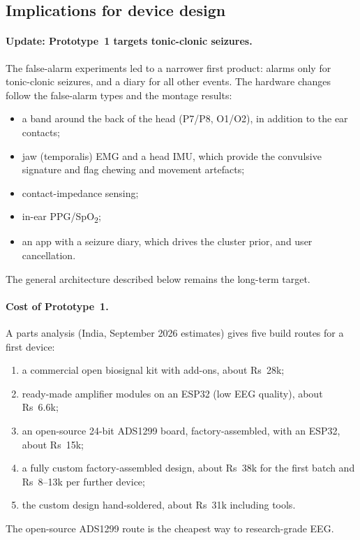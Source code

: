 \subsection{Implications for device design}

\paragraph{Update: Prototype~1 targets tonic-clonic seizures.} The false-alarm experiments led to a narrower first product: alarms only for tonic-clonic seizures, and a diary for all other events. The hardware changes follow the false-alarm types and the montage results:
\begin{itemize}
\item a band around the back of the head (P7/P8, O1/O2), in addition to the ear contacts;
\item jaw (temporalis) EMG and a head IMU, which provide the convulsive signature and flag chewing and movement artefacts;
\item contact-impedance sensing;
\item in-ear PPG/SpO\textsubscript{2};
\item an app with a seizure diary, which drives the cluster prior, and user cancellation.
\end{itemize}
The general architecture described below remains the long-term target.

\paragraph{Cost of Prototype~1.} A parts analysis (India, September 2026 estimates) gives five build routes for a first device:
\begin{enumerate}
\item a commercial open biosignal kit with add-ons, about Rs~28k;
\item ready-made amplifier modules on an ESP32 (low EEG quality), about Rs~6.6k;
\item an open-source 24-bit ADS1299 board, factory-assembled, with an ESP32, about Rs~15k;
\item a fully custom factory-assembled design, about Rs~38k for the first batch and Rs~8--13k per further device;
\item the custom design hand-soldered, about Rs~31k including tools.
\end{enumerate}
The open-source ADS1299 route is the cheapest way to research-grade EEG.

